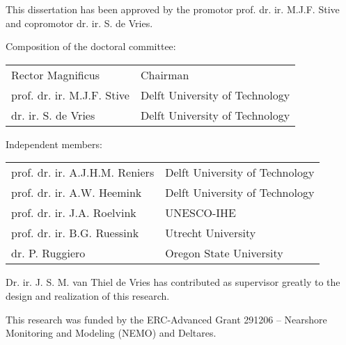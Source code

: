 \thispagestyle{empty}

\hfill

\vfill

\noindent This dissertation has been approved by the promotor
prof. dr. ir. M.J.F. Stive and copromotor dr. ir. S. de Vries.

\bigskip

\noindent Composition of the doctoral committee:

\begin{table}[h]
  \begin{tabular}{p{5cm} l}
    Rector Magnificus              & Chairman \\
    prof. dr. ir. M.J.F. Stive     & Delft University of Technology \\
    dr. ir. S. de Vries            & Delft University of Technology \\
  \end{tabular}
\end{table}

\noindent Independent members:

\begin{table}[h]
  \begin{tabular}{p{5cm} l}
    prof. dr. ir. A.J.H.M. Reniers & Delft University of Technology \\
    prof. dr. ir. A.W. Heemink     & Delft University of Technology \\
    prof. dr. ir. J.A. Roelvink    & UNESCO-IHE \\
    prof. dr. ir. B.G. Ruessink    & Utrecht University \\
    dr. P. Ruggiero                & Oregon State University \\
  \end{tabular}
\end{table}

\vfill

\noindent Dr. ir. J. S. M. van Thiel de Vries has contributed as
supervisor greatly to the design and realization of this research.

\bigskip

\noindent This research was funded by the ERC-Advanced Grant 291206 --
Nearshore Monitoring and Modeling (NEMO) and Deltares.

